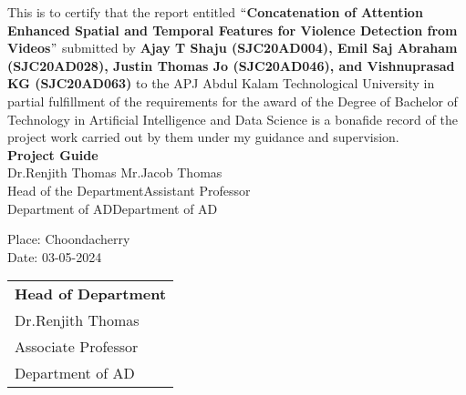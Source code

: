 {\justifying This is to certify that the report entitled {\bf $``$Concatenation of Attention Enhanced Spatial and Temporal Features for Violence Detection from Videos$"$} submitted by { \bf Ajay T Shaju (SJC20AD004), Emil Saj Abraham (SJC20AD028), Justin Thomas Jo (SJC20AD046), and Vishnuprasad KG (SJC20AD063)} to the APJ Abdul Kalam Technological University in partial fulfillment of the requirements for the award of the Degree of Bachelor of Technology in Artificial Intelligence and Data Science is a bonafide record of the project work carried out by them under my guidance and supervision.\vspace{0.9 cm}\\
{\bf Project Guide}\hspace{8.3 cm}{\bf Project Coordinator}\\
Dr.Renjith Thomas\hspace{7.6 cm} Mr.Jacob Thomas\\
Head of the Department\hspace{6.85 cm}Assistant Professor\hspace{2.6 cm}\\Department of AD\hspace{7.9 cm}Department of AD
\vspace{1.3 cm}\\
\begin{minipage}[t]{0.5\textwidth}
\begin{flushleft}
\setlength{\leftskip}{0pt} %
\vspace{0.05 cm}
Place: Choondacherry \\
Date: 03-05-2024
\end{flushleft}
\end{minipage}%
\begin{minipage}[t]{0.49\textwidth}
\begin{flushright}
\begin{tabular}{l}
\textbf{Head of Department} \\
Dr.Renjith Thomas \\
Associate Professor \\
Department of AD
\end{tabular}
\end{flushright}
\end{minipage}
                

}
